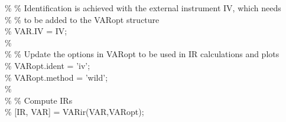 \hspace{1mm}\hspace{5mm} \hspace{5mm} \textcolor{matlabgreen}{\% }\textcolor{matlabgreen}{\% Identification is achieved with the external instrument IV, which needs }\\ 
\hspace{1mm}\hspace{5mm} \hspace{5mm} \textcolor{matlabgreen}{\% }\textcolor{matlabgreen}{\% to be added to the VARopt structure }\\ 
\hspace{1mm}\hspace{5mm} \hspace{5mm} \textcolor{matlabgreen}{\% VAR.IV = IV; }\\ 
\hspace{1mm}\hspace{5mm} \hspace{5mm} \textcolor{matlabgreen}{\%  }\\ 
\hspace{1mm}\hspace{5mm} \hspace{5mm} \textcolor{matlabgreen}{\% }\textcolor{matlabgreen}{\% Update the options in VARopt to be used in IR calculations and plots }\\ 
\hspace{1mm}\hspace{5mm} \hspace{5mm} \textcolor{matlabgreen}{\% VARopt.ident = 'iv'; }\\ 
\hspace{1mm}\hspace{5mm} \hspace{5mm} \textcolor{matlabgreen}{\% VARopt.method = 'wild'; }\\ 
\hspace{1mm}\hspace{5mm} \hspace{5mm} \textcolor{matlabgreen}{\%  }\\ 
\hspace{1mm}\hspace{5mm} \hspace{5mm} \textcolor{matlabgreen}{\% }\textcolor{matlabgreen}{\% Compute IRs }\\ 
\hspace{1mm}\hspace{5mm} \hspace{5mm} \textcolor{matlabgreen}{\% [IR, VAR] = VARir(VAR,VARopt); }\\ 
